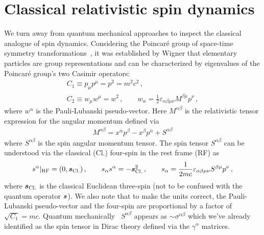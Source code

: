 \section{Classical relativistic spin dynamics}
\label{sec:cspin}
\noindent We turn away from quantum mechanical approaches to inspect the classical analogue of spin dynamics. Considering the Poincar{\'e} group of space-time symmetry
transformations~\citep{Weinberg:1995mt,greiner2012quantum}, it was established by Wigner that elementary particles are group representations and can be characterized by eigenvalues of the Poincar{\'e} group's two Casimir operators:
\begin{gather}
    C_{1}\equiv p_{\mu}p^{\mu} = p^{2} = m^{2}c^{2}\,,\\
    C_{2}\equiv w_{\mu}w^{\mu} = w^{2}\,,\qquad w_{\alpha}=\frac{1}{2}\varepsilon_{\alpha\beta\mu\nu}M^{\beta\mu}p^{\nu}\,,
\end{gather}
where $w^{\alpha}$ is the Pauli-Lubanski pseudo-vector. Here $M^{\alpha\beta}$ is the relativistic tensor expression for the angular momentum defined via
\begin{gather}
    M^{\alpha\beta} = x^{\alpha}p^{\beta}-x^{\beta}p^{\alpha} + S^{\alpha\beta}
\end{gather}
where $S^{\alpha\beta}$ is the spin angular momentum tensor. The spin tensor $S^{\alpha\beta}$ can be understood via the classical (Cl.) four-spin in the rest frame (RF) as
\begin{gather}
    \label{fourspin}
    s^{\alpha}\vert_\mathrm{RF} = (0,\boldsymbol{s}_\mathrm{Cl.})\,,\qquad s_{\alpha}s^{\alpha} = -\boldsymbol{s}_\mathrm{Cl.}^{2}\,,\qquad s_{\alpha} = \frac{1}{2mc}\varepsilon_{\alpha\beta\mu\nu}S^{\beta\mu}p^{\nu}\,,
\end{gather}
where $\boldsymbol{s}_\mathrm{Cl.}$ is the classical Euclidean three-spin (not to be confused with the quantum operator $\boldsymbol{s}$). We also note that to make the units correct, the Pauli-Lubanski pseudo-vector and the four-spin are proportional by a factor of $\sqrt{C_{1}}=mc$. Quantum mechanically~\citep{Ohlsson:2011zz} $S^{\alpha\beta}$ appears as $\sim\sigma^{\alpha\beta}$ which we've already identified as the spin tensor in Dirac theory defined via the $\gamma^{\alpha}$ matrices.

